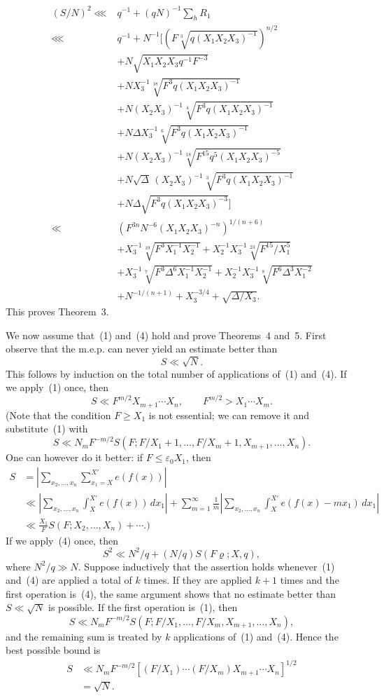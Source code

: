 \documentclass[10pt]{article}
\begin{document}
\[
\begin{aligned}
  (S/N)^2
  \lll{}&q^{-1}+(qN)^{-1}\sum_hR_1\\
  \lll{}&q^{-1}+N^{-1}\Bigg[
    \left(F\sqrt[3]{q(X_1X_2X_3)^{-1}}\right)^{n/2}\\
  &+N\sqrt{X_1X_2X_3q^{-1}F^{-3}}\\
  &+NX_3^{-1}\sqrt[18]{F^3q(X_1X_2X_3)^{-1}}\\
  &+N(X_2X_3)^{-1}\sqrt[4]{F^3q(X_1X_2X_3)^{-1}}\\
  &+N\Delta X_3^{-1}\sqrt[6]{F^3q(X_1X_2X_3)^{-1}}\\
  &+N(X_2X_3)^{-1}\sqrt[18]{F^{15}q^5(X_1X_2X_3)^{-5}}\\
  &+N\sqrt\Delta\,(X_2X_3)^{-1}\sqrt[3]{F^3q(X_1X_2X_3)^{-1}}\\
  &+N\Delta\sqrt{F^3q(X_1X_2X_3)^{-3}}
  \Bigg]\\
  \ll{}&\left(F^{3n}N^{-6}(X_1X_2X_3)^{-n}\right)^{1/(n+6)}\\
  &+X_3^{-1}\sqrt[19]{F^3X_1^{-1}X_2^{-1}}
  +X_2^{-1}X_3^{-1}\sqrt[23]{F^{15}/X_1^5}\\
  &+X_3^{-1}\sqrt[7]{F^3\Delta^6X_1^{-1}X_2^{-1}}
  +X_2^{-1}X_3^{-1}\sqrt[8]{F^6\Delta^3X_1^{-2}}\\
  &+N^{-1/(n+1)}+X_3^{-3/4}+\sqrt{\Delta/X_3}.
\end{aligned}
\]
This proves Theorem~3.

We now assume that~(1) and~(4) hold and prove Theorems~4 and~5. First observe that the m.e.p. can never yield an estimate better than
\[
  S\ll\sqrt N.
\]
This follows by induction on the total number of applications of~(1) and~(4). If we apply~(1) once, then
\[
  S\ll F^{m/2}X_{m+1}\cdots X_n,
  \qquad F^{m/2}>X_1\cdots X_m.
\]
(Note that the condition $F\geqslant X_1$ is not essential; we can remove it and substitute~(1) with
\[
  S\ll N_mF^{-m/2}
  S\left(F;F/X_1+1,\ldots,F/X_m+1,X_{m+1},\ldots,X_n\right).
\]
One can however do it better: if $F\leqslant\varepsilon_0X_1$, then
\[
\begin{aligned}
  S&=\left|\sum_{x_2,\ldots,x_n}\sum_{x_1=X}^{X'}e(f(x))\right|\\
  &\ll\left|\sum_{x_2,\ldots,x_n}\int_X^{X'}e(f(x))\,dx_1\right|
  +\sum_{m=1}^{\infty}\frac1m
  \left|\sum_{x_2,\ldots,x_n}\int_X^{X'}e(f(x)-mx_1)\,dx_1\right|\\
  &\ll\frac{X_1}{F}S(F;X_2,\ldots,X_n)+\cdots.)
\end{aligned}
\]
If we apply~(4) once, then
\[
  S^2\ll N^2/q+(N/q)S(F\varrho;X,q),
\]
where $N^2/q\gg N$. Suppose inductively that the assertion holds whenever~(1) and~(4) are applied a total of $k$ times. If they are applied $k+1$ times and the first operation is~(4), the same argument shows that no estimate better than $S\ll\sqrt N$ is possible. If the first operation is~(1), then
\[
  S\ll N_mF^{-m/2}
  S(F;F/X_1,\ldots,F/X_m,X_{m+1},\ldots,X_n),
\]
and the remaining sum is treated by $k$ applications of~(1) and~(4). Hence the best possible bound is
\[
\begin{aligned}
  S&\ll N_mF^{-m/2}
  \left[(F/X_1)\cdots(F/X_m)X_{m+1}\cdots X_n\right]^{1/2}\\
  &=\sqrt N.
\end{aligned}
\]
\end{document}
